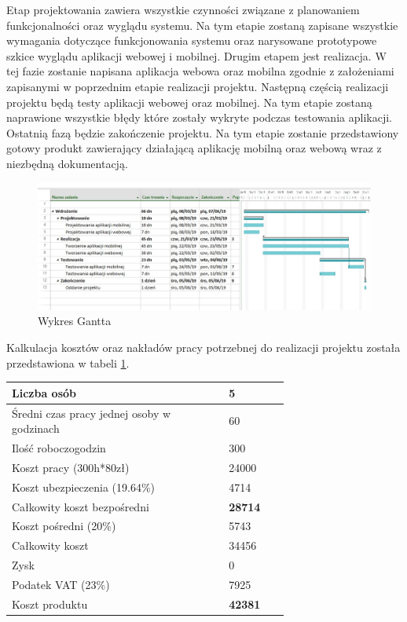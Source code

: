 \documentclass[12pt]{article}
\begin{document}
Etap projektowania zawiera wszystkie czynności związane z planowaniem funkcjonalności oraz wyglądu systemu. Na tym etapie zostaną zapisane wszystkie wymagania dotyczące funkcjonowania systemu oraz narysowane prototypowe szkice wyglądu aplikacji webowej i mobilnej.
Drugim etapem jest realizacja. W tej fazie zostanie napisana aplikacja webowa oraz mobilna zgodnie z założeniami zapisanymi w poprzednim etapie realizacji projektu. Następną częścią realizacji projektu będą testy aplikacji webowej oraz mobilnej.  Na tym etapie zostaną naprawione wszystkie błędy które zostały wykryte podczas testowania aplikacji. Ostatnią fazą będzie zakończenie projektu. Na tym etapie zostanie przedstawiony gotowy produkt zawierający działającą aplikację mobilną oraz webową wraz z niezbędną dokumentacją. 
	\begin{figure}[H]
		\centering
		\includegraphics[scale=0.75, angle=270]{wykres_ganttaV3.png}
		\caption{Wykres Gantta}
	\end{figure}
	

Kalkulacja kosztów oraz nakładów pracy potrzebnej do realizacji projektu została przedstawiona w tabeli \ref{kosztorys}.

\begin{table}[H]
\begin{center}
\label{kosztorys}
	\begin{tabular}{|p{0.55\linewidth}|p{0.15\linewidth}|}%
	\hline
	Liczba osób 	& 5 				\\ \hline
	Średni czas pracy jednej osoby w godzinach		& 60\\ \hline
	Ilość roboczogodzin & 300	\\ \hline
	Koszt pracy (300h*80zł) & 24000	\\ \hline
	Koszt ubezpieczenia (19.64\%) & 4714	\\ \hline
	Całkowity koszt bezpośredni & \textbf{28714}	\\ \hline
	Koszt pośredni (20\%) & 5743\\ \hline
	Całkowity koszt & 34456\\ \hline
	Zysk & 0\\ \hline
	Podatek VAT (23\%) & 7925\\ \hline
	Koszt produktu & \textbf{42381}\\ \hline
	\end{tabular}
\end{center}
\end{table}
\end{document}

